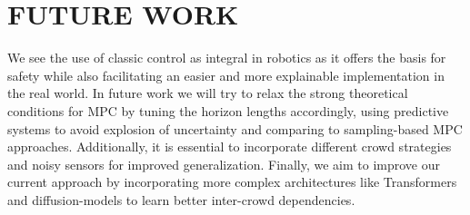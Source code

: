 \documentclass[letterpaper,conference,10pt]{IEEEconf}
\begin{document}
\section{FUTURE WORK}

We see the use of classic control as integral in robotics as it offers the basis for safety while also facilitating an easier and more explainable implementation in the real world. In future work we will try to relax the strong theoretical conditions for MPC by tuning the horizon lengths accordingly, using predictive systems to avoid explosion of uncertainty and comparing to sampling-based MPC approaches. Additionally, it is essential to incorporate different crowd strategies and noisy sensors for improved generalization. Finally, we aim to improve our current approach by incorporating more complex architectures like Transformers and diffusion-models to learn better inter-crowd dependencies.

\end{document}
